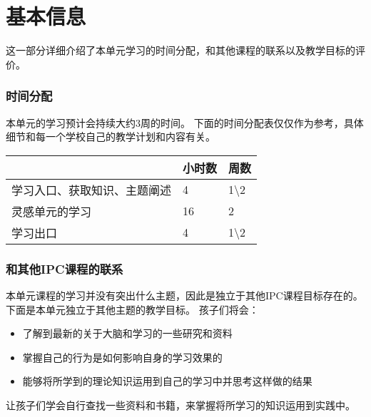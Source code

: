 \chapter{基本信息}
    这一部分详细介绍了本单元学习的时间分配，和其他课程的联系以及教学目标的评价。

\subsection{时间分配}
    本单元的学习预计会持续大约3周的时间。
    下面的时间分配表仅仅作为参考，具体细节和每一个学校自己的教学计划和内容有关。


\begin{table}[h]     
\begin{tabular}{l|l|l}
\hline
\colorbox[gray]{0.95}{ & 小时数 & 周数 } \\
\hline
学习入口、获取知识、主题阐述 &  4 & 1\textbackslash2 \\
灵感单元的学习  & 16  &   2  \\
学习出口  & 4  &  1\textbackslash2 \\
\hline
\end{tabular}
\end{table}



\subsection{和其他IPC课程的联系}
    本单元课程的学习并没有突出什么主题，因此是独立于其他IPC课程目标存在的。下面是本单元独立于其他主题的教学目标。
    孩子们将会：
    \begin{itemize}
      \item 了解到最新的关于大脑和学习的一些研究和资料 
      \item 掌握自己的行为是如何影响自身的学习效果的
      \item 能够将所学到的理论知识运用到自己的学习中并思考这样做的结果
    \end{itemize}

\begin{exercise}
  让孩子们学会自行查找一些资料和书籍，来掌握将所学习的知识运用到实践中。
  
\end{exercise}
